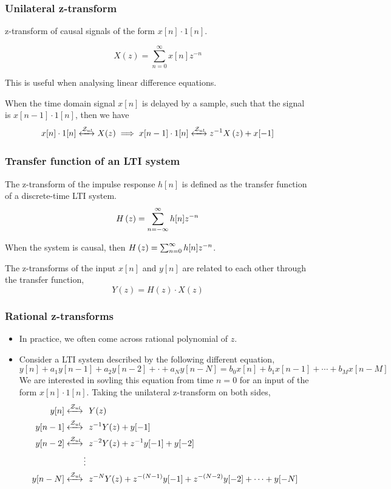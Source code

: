 \documentclass[aspectratio=169]{beamer}
\let\olditem\item
\renewcommand{\item}{\setlength{\itemsep}{\fill}\olditem}
\def\mc{\ensuremath\mathcal}
\def\lp{\ensuremath\left(}
\def\rp{\ensuremath\right)}
\begin{document}
\begin{frame}[t]
  \frametitle{Unilateral z-transform}

  z-transform of causal signals of the form $x[n]\cdot 1[n]$.

  \[ X(z) = \sum_{n=0}^{\infty} x[n] z^{-n} \]
  
  This is useful when analysing linear difference equations.

  When the time domain signal $x[n]$ is delayed by a sample, such that the signal is $x[n-1] \cdot 1[n]$, then we have
  \[ x[n] \cdot 1[n] \xleftrightarrow{\mc{Z}_{ul}} X(z) \implies x[n-1] \cdot 1[n] \xleftrightarrow{\mc{Z}_{ul}} z^{-1} X\lp z \rp + x[-1] \] 
\end{frame}

\begin{frame}[t]
  \frametitle{Transfer function of an LTI system}

  The z-transform of the impulse response $h[n]$ is defined as the transfer function of a discrete-time LTI system.
  \[ H\lp z \rp = \sum_{n=-\infty}^{\infty} h[n] z^{-n} \]

  When the system is causal, then $H\lp z \rp = \sum_{n=0}^{\infty} h[n] z^{-n}$.

  The z-transforms of the input $x[n]$ and $y[n]$ are related to each other through the transfer function, 
  \[ Y(z) = H(z) \cdot X(z) \]
\end{frame}

\begin{frame}[t]
  \frametitle{Rational z-transforms}
  \begin{itemize}
    \item In practice, we often come across rational polynomial of $z$.
    \item Consider a LTI system described by the following different equation,
    \[ y[n] + a_1 y[n-1] + a_2 y[n-2] + \cdot + a_Ny[n - N] = b_0x[n] + b_1 x[n-1] + \cdots + b_M x[n - M] \] 
    We are interested in sovling this equation from time $n = 0$ for an input of the form $x[n]\cdot 1[n]$. Taking the unilateral z-transform on both sides,
    \[ \begin{split}
        y[n] \xleftrightarrow{\mc{Z}_{ul}} \,\, & \,\, Y(z) \\
        y[n-1] \xleftrightarrow{\mc{Z}_{ul}} \,\, & \,\, z^{-1}Y(z) + y[-1] \\
        y[n-2] \xleftrightarrow{\mc{Z}_{ul}} \,\, & \,\, z^{-2}Y(z) + z^{-1}y[-1] + y[-2] \\
        \vdots & \\
        y[n-N] \xleftrightarrow{\mc{Z}_{ul}} \,\, & \,\, z^{-N}Y(z) + z^{-(N-1)}y[-1] + z^{-(N-2)}y[-2] + \cdots + y[-N]
        \end{split} 
        \]
  \end{itemize}
\end{frame}
\end{document}
